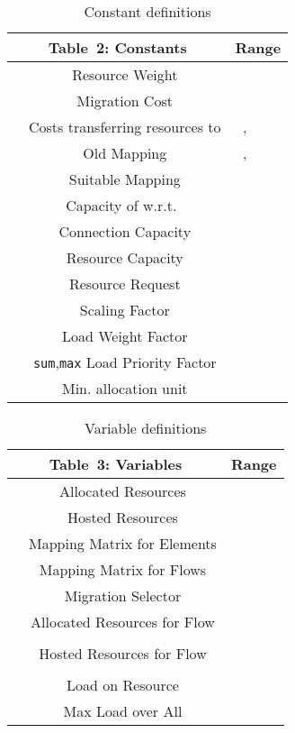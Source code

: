 \documentclass[conference,10pt]{IEEEtran}
\begin{document}
\begin{table*} [th]
\begin{center}
\begin{scriptsize}
\begin{tabular}{ | c | c | c | c |}
\hline
\multicolumn{2}{|c|}{Table~2: Constants} & \multicolumn{2}{|c|}{Range}\\
\hline
   & Resource Weight &  & \\
   & Migration Cost &  & \\
   & Costs transferring  resources to  & ,  &  \\
   & Old Mapping & ,  & \\
   & Suitable Mapping &  & \\
   & Capacity of  w.r.t.~ &  & \\
   & Connection Capacity &  & \\
   & Resource  Capacity &  & \\
 & Resource Request &   & \\
 & Scaling Factor &  & \\
   & Load Weight Factor&  & \\
   & \texttt{sum},\texttt{max} Load Priority Factor & & \\
   & Min.  allocation unit &  & \\
  \hline
\end{tabular}\label{consts}
\end{scriptsize}
\end{center}
\caption{Constant definitions\label{tab:constants}}
\end{table*}


\begin{table*} [th]
\begin{center}
\begin{scriptsize}
\begin{tabular}{ | c | c | c | c |}
\hline
\multicolumn{2}{|c|}{Table~3: Variables} & \multicolumn{2}{|c|}{Range}\\
\hline
   & Allocated Resources &  & \\
   & Hosted Resources &  & \\
   & Mapping Matrix for Elements &  & \\
   & Mapping Matrix for Flows &  & \\
   & Migration Selector &  & \\
   & Allocated Resources for Flow &  & \\
	& &  & \\
   & Hosted Resources for Flow &  & \\
	& &  & \\
 & Load on Resource  &  & \\
   & Max Load over All  & & \\
  \hline
\end{tabular}\label{vars}
\end{scriptsize}
\caption{Variable definitions}\label{tab:variables}
\end{center}
\end{table*}
\end{document}
